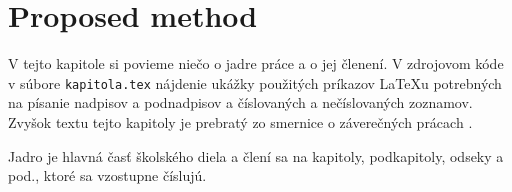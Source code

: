 \chapter{Proposed method}

\label{kap:proposedMethod} %

V tejto kapitole si povieme niečo o jadre práce a o jej členení. V
zdrojovom kóde v súbore \verb'kapitola.tex' nájdenie ukážky použitých
príkazov LaTeXu potrebných na písanie nadpisov a podnadpisov a
číslovaných a nečíslovaných zoznamov. Zvyšok textu tejto kapitoly je
prebratý zo smernice o záverečných prácach \cite[článok 5]{smernica}.

Jadro je hlavná časť školského diela a člení sa na kapitoly,
podkapitoly, odseky a pod., ktoré sa vzostupne číslujú.
